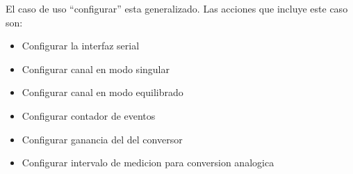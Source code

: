 El caso de uso ``configurar'' esta generalizado. Las acciones que incluye este caso son:
\begin{itemize}
	\item Configurar la interfaz serial
	\item Configurar canal en modo singular
	\item Configurar canal en modo equilibrado
	\item Configurar contador de eventos
	\item Configurar ganancia del del conversor
	\item Configurar intervalo de medicion para conversion analogica
\end{itemize}


